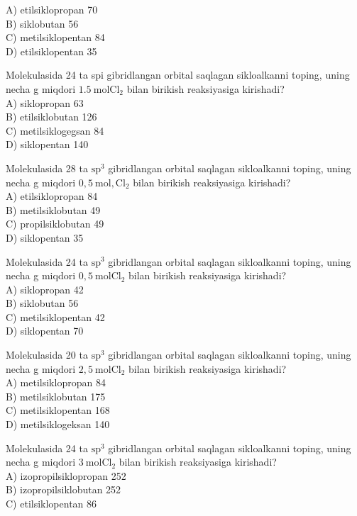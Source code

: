A) etilsiklopropan 70\\
B) siklobutan 56\\
C) metilsiklopentan 84\\
D) etilsiklopentan 35
  \item Molekulasida 24 ta spi gibridlangan orbital saqlagan sikloalkanni toping, uning necha g miqdori $1.5 \mathrm{~mol} \mathrm{Cl}_{2}$ bilan birikish reaksiyasiga kirishadi?\\
A) siklopropan 63\\
B) etilsiklobutan 126\\
C) metilsiklogegsan 84\\
D) siklopentan 140
  \item Molekulasida 28 ta $\mathrm{sp}^{3}$ gibridlangan orbital saqlagan sikloalkanni toping, uning necha g miqdori $0,5 \mathrm{~mol}, \mathrm{Cl}_{2}$ bilan birikish reaksiyasiga kirishadi?\\
A) etilsiklopropan 84\\
B) metilsiklobutan 49\\
C) propilsiklobutan 49\\
D) siklopentan 35
  \item Molekulasida 24 ta $\mathrm{sp}^{3}$ gibridlangan orbital saqlagan sikloalkanni toping, uning necha g miqdori $0,5 \mathrm{~mol} \mathrm{Cl}_{2}$ bilan birikish reaksiyasiga kirishadi?\\
A) siklopropan 42\\
B) siklobutan 56\\
C) metilsiklopentan 42\\
D) siklopentan 70
  \item Molekulasida 20 ta $\mathrm{sp}^{3}$ gibridlangan orbital saqlagan sikloalkanni toping, uning necha g miqdori $2,5 \mathrm{~mol} \mathrm{Cl}_{2}$ bilan birikish reaksiyasiga kirishadi?\\
A) metilsiklopropan 84\\
B) metilsiklobutan 175\\
C) metilsiklopentan 168\\
D) metilsiklogeksan 140
  \item Molekulasida 24 ta $\mathrm{sp}^{3}$ gibridlangan orbital saqlagan sikloalkanni toping, uning necha g miqdori $3 \mathrm{~mol} \mathrm{Cl}_{2}$ bilan birikish reaksiyasiga kirishadi?\\
A) izopropilsiklopropan 252\\
B) izopropilsiklobutan 252\\
C) etilsiklopentan 86\\
